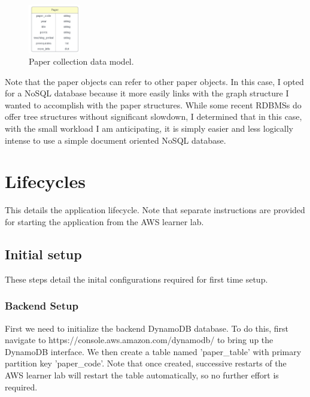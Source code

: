 \documentclass[12pt]{article}
\begin{document}
\begin{figure}[h!]
    \caption{Paper collection data model.}
    \label{fig: paper_data_model}
    \begin{center}
        \includegraphics[width=0.2\textwidth]{../docs-assets/paper_erd.PNG}
    \end{center}
\end{figure}

Note that the paper objects can refer to other paper objects. In this case, I opted for a NoSQL database because it more easily links with the graph structure I wanted to accomplish with the paper structures. While some recent RDBMSs do offer tree structures without significant slowdown, I determined that in this case, with the small workload I am anticipating, it is simply easier and less logically intense to use a simple document oriented NoSQL database.

\section{Lifecycles}

This details the application lifecycle. Note that separate instructions are provided for starting the application from the AWS learner lab. 

\subsection{Initial setup}

These steps detail the inital configurations required for first time setup.

\subsubsection{Backend Setup}

First we need to initialize the backend DynamoDB database. To do this, first navigate to https://console.aws.amazon.com/dynamodb/ to bring up the DynamoDB interface. 
We then create a table named 'paper\_table' with primary partition key 'paper\_code'. Note that once created, successive restarts of the AWS learner lab will restart the table automatically, so no further effort is required. 
\end{document}
